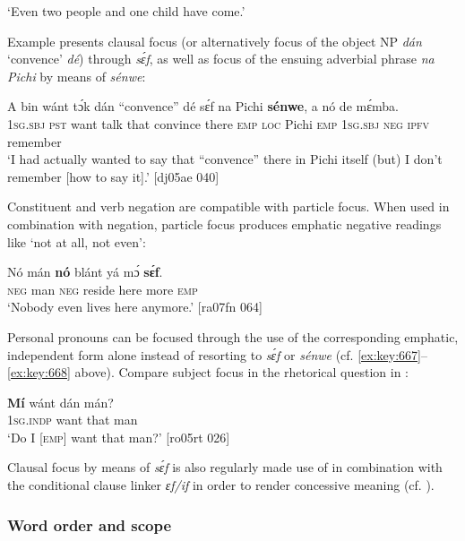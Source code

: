 \glt ‘Even two people and one child have come.’ 
\z

Example  presents clausal focus (or alternatively focus of the object NP \textit{dán} ‘convence’ \textit{dé}) through \textit{sɛ́f}, as well as focus of the ensuing adverbial phrase \textit{na Pichi} by means of \textit{sénwe}: 


\ea%
    \label{ex:key:680}
    \gll A    bin  wánt  tɔ́k  dán  “convence”  dé    sɛ́f  
na  Pichi  \textbf{sénwe},  a    nó  de  mɛ́mba.\\
\textsc{1sg.sbj}  \textsc{pst}  want  talk  that  convince    there  \textsc{emp}  
\textsc{loc}  Pichi  \textsc{emp}     \textsc{1sg.sbj}  \textsc{neg}  \textsc{ipfv}  remember\\

\glt ‘I had actually wanted to say that “convence” there in Pichi itself (but) 
I don’t remember [how to say it].’ [dj05ae 040]
\z

Constituent and verb negation are compatible with particle focus. When used in combination with negation, particle focus produces emphatic negative readings like ‘not at all, not even’:


\ea%
    \label{ex:key:681}
    \gll Nó  mán    \textbf{nó}  blánt  yá    mɔ́    \textbf{sɛ́f}.\\
\textsc{neg}  man    \textsc{neg}  reside  here    more  \textsc{emp}\\

\glt ‘Nobody even lives here anymore.’ [ra07fn 064]
\z

Personal pronouns can be focused through the use of the corresponding emphatic, independent form alone instead of resorting to \textit{sɛ́f} or \textit{sénwe} (cf. \ref{ex:key:667}–\ref{ex:key:668} above). Compare subject focus in the rhetorical question in :


\ea%
    \label{ex:key:682}
    \gll \textbf{Mí}    wánt  dán    mán?\\
\textsc{1sg.indp}  want  that    man\\

\glt ‘Do I [\textsc{emp}] want that man?’ [ro05rt 026]
\z

Clausal focus by means of \textit{sɛ́f} is also regularly made use of in combination with the conditional clause linker \textit{ɛf/if} in order to render concessive meaning (cf. ).

\subsubsection{Word order and scope}

